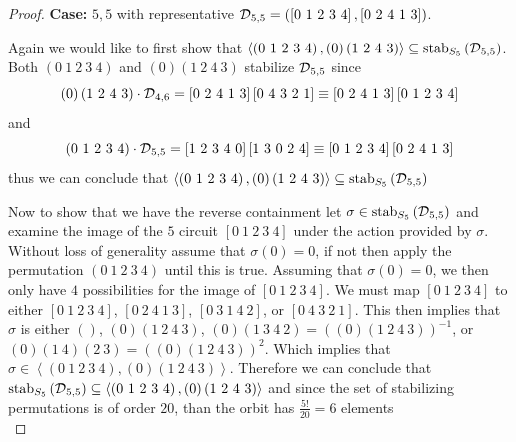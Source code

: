 \begin{proof}
\vspace{2ex}
\noindent
{\bf Case:} $5,5$ with representative $\operatorname{\mathcal{D}}_{5,5} = \left(\left[ 0\ 1\ 2\ 3\ 4 \right],\left[0\ 2\ 4\ 1\ 3 \right]\right)$.\\
\vspace{2ex}

\noindent
Again we would like to first show that $\left<  \left(0\ 1\ 2\ 3\ 4\right),\left(0\right)\left(1\ 2\ 4\ 3\right)\right> \subseteq \stab{S_5}{\pcd_{5,5}}$. Both $\left(0\ 1\ 2\ 3\ 4 \right)$ and $\left(0\right)\left(1\ 2\ 4\ 3\right)$ stabilize $\operatorname{\mathcal{D}}_{5,5}$ since
\[
\acts{\left(0\right)\left(1\ 2\ 4\ 3\right)}{\pcd_{4,6}} = \left[0\ 2\ 4\ 1\ 3\right]\left[0\ 4\ 3\ 2\ 1\right] \equiv \left[0\ 2\ 4\ 1\ 3\right]\left[0\ 1\ 2\ 3\ 4\right]
\] 
and
\[
\acts{\left(0\ 1\ 2\ 3\ 4\right)}{\pcd_{5,5}} = \left[1\ 2\ 3\ 4\ 0\right]\left[1\ 3\ 0\ 2\ 4\right] \equiv \left[0\ 1\ 2\ 3\ 4\right]\left[0\ 2\ 4\ 1\ 3\right]
\] thus we can conclude that $\left<  \left(0\ 1\ 2\ 3\ 4\right),\left(0\right)\left(1\ 2\ 4\ 3\right)\right> \subseteq \stab{S_5}{\pcd_{5,5}}$

Now to show that we have the reverse containment let $\sigma \in \operatorname{\mathrm{stab}}_{S_5}\left(\operatorname{\mathcal{D}}_{5,5} \right)$ and examine the image of the $5$ circuit $[0\ 1\  2\  3\  4]$ under the action provided by $\sigma$. Without loss of generality assume that $\sigma(0) = 0$, if not then apply the permutation $(0\ 1\ 2\ 3\ 4)$ until this is true. Assuming that $\sigma(0) = 0$, we then only have $4$ possibilities for the image of $[0\ 1\ 2\ 3\ 4]$. We must map $\left[ 0\ 1\ 2\ 3\ 4\right]$ to either $\left[0 \ 1\ 2\ 3\ 4 \right]$, $\left[ 0 \ 2\ 4\ 1\ 3 \right]$, $\left[ 0\ 3\ 1\ 4\ 2\right]$, or $[0\ 4\ 3\ 2\ 1]$. This then implies that $\sigma$ is either $\left(\right)$,  $(0)(1\ 2\ 4\ 3)$,  $(0)(1\ 3\ 4\ 2) = ((0)(1\ 2\ 4\ 3))^{-1} $, or $ (0)(1\ 4)(2\ 3) = \left((0)(1\ 2\ 4\ 3 )\right)^2$. Which implies that $\sigma \in \left< (0\ 1\ 2\ 3\ 4), (0)(1\ 2\ 4\ 3) \right> $. Therefore we can conclude that $\stab{S_5}{\pcd_{5,5}} \subseteq \left<  \left(0\ 1\ 2\ 3\ 4\right),\left(0\right)\left(1\ 2\ 4\ 3\right)\right>$ and since the set of stabilizing permutations is of order $20$, than the orbit has $\frac{5!}{20} = 6 $ elements \\


\end{proof}
